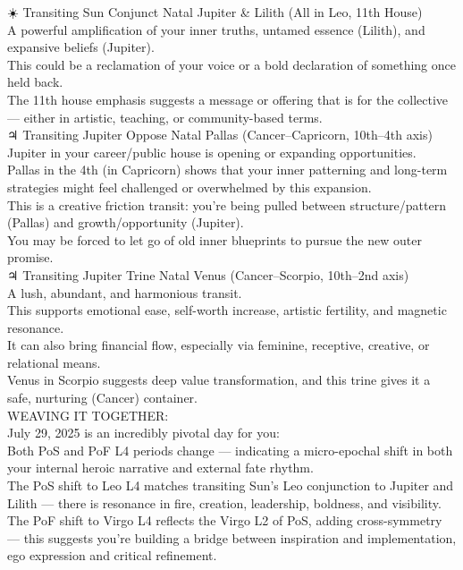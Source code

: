 \documentclass{article}
\begin{document}
☀️ Transiting Sun Conjunct Natal Jupiter \& Lilith (All in Leo, 11th House)\\
A powerful amplification of your inner truths, untamed essence (Lilith), and expansive beliefs (Jupiter).\\
This could be a reclamation of your voice or a bold declaration of something once held back.\\
The 11th house emphasis suggests a message or offering that is for the collective --- either in artistic, teaching, or community-based terms.\\
♃ Transiting Jupiter Oppose Natal Pallas (Cancer--Capricorn, 10th--4th axis)\\
Jupiter in your career/public house is opening or expanding opportunities.\\
Pallas in the 4th (in Capricorn) shows that your inner patterning and long-term strategies might feel challenged or overwhelmed by this expansion.\\
This is a creative friction transit: you're being pulled between structure/pattern (Pallas) and growth/opportunity (Jupiter).\\
You may be forced to let go of old inner blueprints to pursue the new outer promise.\\
♃ Transiting Jupiter Trine Natal Venus (Cancer--Scorpio, 10th--2nd axis)\\
A lush, abundant, and harmonious transit.\\
This supports emotional ease, self-worth increase, artistic fertility, and magnetic resonance.\\
It can also bring financial flow, especially via feminine, receptive, creative, or relational means.\\
Venus in Scorpio suggests deep value transformation, and this trine gives it a safe, nurturing (Cancer) container.\\
WEAVING IT TOGETHER:\\
July 29, 2025 is an incredibly pivotal day for you:\\
Both PoS and PoF L4 periods change --- indicating a micro-epochal shift in both your internal heroic narrative and external fate rhythm.\\
The PoS shift to Leo L4 matches transiting Sun's Leo conjunction to Jupiter and Lilith --- there is resonance in fire, creation, leadership, boldness, and visibility.\\
The PoF shift to Virgo L4 reflects the Virgo L2 of PoS, adding cross-symmetry --- this suggests you're building a bridge between inspiration and implementation, ego expression and critical refinement.\\
\end{document}
